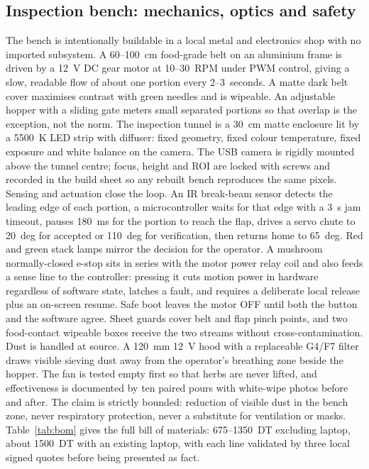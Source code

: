 \documentclass[10pt,conference,a4paper]{IEEEtran}
\begin{document}
\subsection{Inspection bench: mechanics, optics and safety}
The bench is intentionally buildable in a local metal and electronics shop with no imported subsystem. A 60--100~cm food-grade belt on an aluminium frame is driven by a 12~V DC gear motor at 10--30~RPM under PWM control, giving a slow, readable flow of about one portion every 2--3~seconds. A matte dark belt cover maximises contrast with green needles and is wipeable. An adjustable hopper with a sliding gate meters small separated portions so that overlap is the exception, not the norm. The inspection tunnel is a 30~cm matte enclosure lit by a 5500~K LED strip with diffuser: fixed geometry, fixed colour temperature, fixed exposure and white balance on the camera. The USB camera is rigidly mounted above the tunnel centre; focus, height and ROI are locked with screws and recorded in the build sheet so any rebuilt bench reproduces the same pixels.
Sensing and actuation close the loop. An IR break-beam sensor detects the leading edge of each portion, a microcontroller waits for that edge with a 3~s jam timeout, pauses 180~ms for the portion to reach the flap, drives a servo chute to 20~deg for accepted or 110~deg for verification, then returns home to 65~deg. Red and green stack lamps mirror the decision for the operator. A mushroom normally-closed e-stop sits in series with the motor power relay coil and also feeds a sense line to the controller: pressing it cuts motion power in hardware regardless of software state, latches a fault, and requires a deliberate local release plus an on-screen resume. Safe boot leaves the motor OFF until both the button and the software agree. Sheet guards cover belt and flap pinch points, and two food-contact wipeable boxes receive the two streams without cross-contamination.
Dust is handled at source. A 120~mm 12~V hood with a replaceable G4/F7 filter draws visible sieving dust away from the operator's breathing zone beside the hopper. The fan is tested empty first so that herbs are never lifted, and effectiveness is documented by ten paired pours with white-wipe photos before and after. The claim is strictly bounded: reduction of visible dust in the bench zone, never respiratory protection, never a substitute for ventilation or masks.
Table~\ref{tab:bom} gives the full bill of materials: 675--1350~DT excluding laptop, about 1500~DT with an existing laptop, with each line validated by three local signed quotes before being presented as fact.
\end{document}
